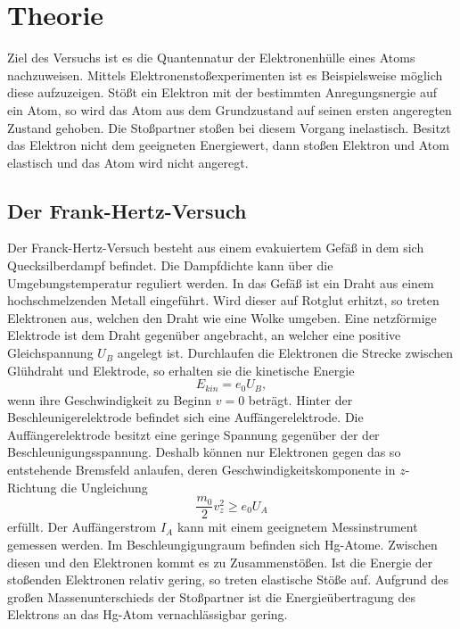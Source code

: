 \section{Theorie}
\label{sec:Theorie}
Ziel des Versuchs ist es die Quantennatur der Elektronenhülle eines Atoms nachzuweisen.
Mittels Elektronenstoßexperimenten ist es Beispielsweise möglich diese aufzuzeigen.
Stößt ein Elektron mit der bestimmten Anregungsnergie auf ein Atom, so wird das Atom aus dem Grundzustand auf seinen ersten angeregten Zustand gehoben.
Die Stoßpartner stoßen bei diesem Vorgang inelastisch.
Besitzt das Elektron nicht dem geeigneten Energiewert, dann stoßen Elektron und Atom elastisch und das Atom wird nicht angeregt.

\subsection{Der Frank-Hertz-Versuch}
Der Franck-Hertz-Versuch besteht aus einem evakuiertem Gefäß in dem sich Quecksilberdampf befindet.
Die Dampfdichte kann über die Umgebungstemperatur reguliert werden.
In das Gefäß ist ein Draht aus einem hochschmelzenden Metall eingeführt.
Wird dieser auf Rotglut erhitzt, so treten Elektronen aus, welchen den Draht wie eine Wolke umgeben.
Eine netzförmige Elektrode ist dem Draht gegenüber angebracht, an welcher eine positive Gleichspannung $U_B$ angelegt ist.
Durchlaufen die Elektronen die Strecke zwischen Glühdraht und Elektrode, so erhalten sie die kinetische Energie
\begin{equation}
  \label{eq:ekin}
  E_{kin} = e_0 U_B  ,
\end{equation}
wenn ihre Geschwindigkeit zu Beginn $v= 0$ beträgt.
Hinter der Beschleunigerelektrode befindet sich eine Auffängerelektrode.
Die Auffängerelektrode besitzt eine geringe Spannung gegenüber der der Beschleunigungsspannung.
Deshalb können nur Elektronen gegen das so entstehende Bremsfeld anlaufen, deren Geschwindigkeitskomponente in $z$-Richtung die Ungleichung
\begin{equation}
  \label{eq:ungl}
  \frac{m_0}{2}v_z^2 \geq e_0 U_A
\end{equation}
erfüllt.
Der Auffängerstrom $I_A$ kann mit einem geeignetem Messinstrument gemessen werden.
Im Beschleungigungraum befinden sich Hg-Atome.
Zwischen diesen und den Elektronen kommt es zu Zusammenstößen.
Ist die Energie der stoßenden Elektronen relativ gering, so treten elastische Stöße auf.
Aufgrund des großen Massenunterschieds der Stoßpartner ist die Energieübertragung des Elektrons an das Hg-Atom vernachlässigbar gering.
